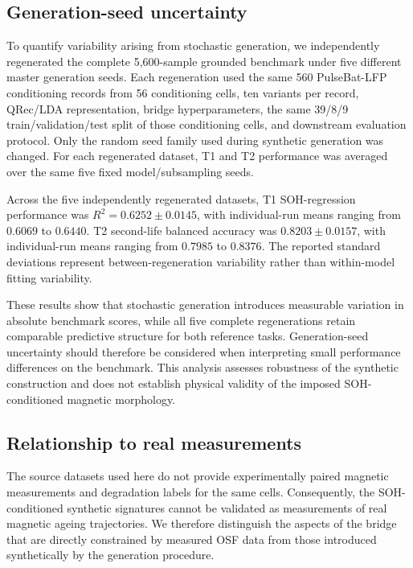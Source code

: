 \documentclass[11pt]{article}
\begin{document}
\subsection*{Generation-seed uncertainty}

To quantify variability arising from stochastic generation, we independently regenerated the complete 5,600-sample grounded benchmark under five different master generation seeds. Each regeneration used the same 560 PulseBat-LFP conditioning records from 56 conditioning cells, ten variants per record, QRec/LDA representation, bridge hyperparameters, the same 39/8/9 train/validation/test split of those conditioning cells,
and downstream evaluation protocol. Only the random seed family used during synthetic generation was changed. For each regenerated dataset, T1 and T2 performance was averaged over the same five fixed model/subsampling seeds.

Across the five independently regenerated datasets, T1 SOH-regression
performance was $R^2 = 0.6252 \pm 0.0145$, with individual-run means ranging
from $0.6069$ to $0.6440$. T2 second-life balanced accuracy was
$0.8203 \pm 0.0157$, with individual-run means ranging from $0.7985$ to
$0.8376$. The reported standard deviations represent between-regeneration
variability rather than within-model fitting variability.

These results show that stochastic generation introduces measurable variation in absolute benchmark scores, while all five complete regenerations retain comparable predictive structure for both reference tasks. Generation-seed uncertainty should therefore be considered when interpreting small performance differences on the benchmark. This analysis assesses robustness of the synthetic construction and does not establish physical validity of the imposed SOH-conditioned magnetic morphology.

\subsection*{Relationship to real measurements}

The source datasets used here do not provide experimentally paired magnetic measurements and degradation labels for the same cells. Consequently, the SOH-conditioned synthetic signatures cannot be validated as measurements of real magnetic ageing trajectories. We therefore distinguish the aspects of
the bridge that are directly constrained by measured OSF data from those introduced synthetically by the generation procedure.
\end{document}

